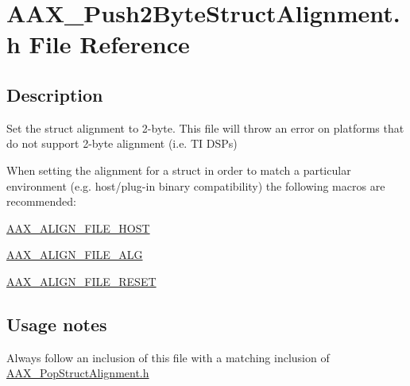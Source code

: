 \hypertarget{a00284}{}\section{A\+A\+X\+\_\+\+Push2\+Byte\+Struct\+Alignment.\+h File Reference}
\label{a00284}


\subsection{Description}
Set the struct alignment to 2-\/byte. This file will throw an error on platforms that do not support 2-\/byte alignment (i.\+e. T\+I D\+S\+Ps) 

When setting the alignment for a struct in order to match a particular environment (e.\+g. host/plug-\/in binary compatibility) the following macros are recommended\+: \begin{DoxyItemize}
\item \hyperlink{a00149_acbef7ed7d077bc9812cb56417e1ad325}{A\+A\+X\+\_\+\+A\+L\+I\+G\+N\+\_\+\+F\+I\+L\+E\+\_\+\+H\+O\+S\+T} \item \hyperlink{a00149_a8fbeac3c5db5ac694e85a021ed74dc9e}{A\+A\+X\+\_\+\+A\+L\+I\+G\+N\+\_\+\+F\+I\+L\+E\+\_\+\+A\+L\+G} \item \hyperlink{a00149_a8aaaefcc3d87025e84d5ccb99b650a87}{A\+A\+X\+\_\+\+A\+L\+I\+G\+N\+\_\+\+F\+I\+L\+E\+\_\+\+R\+E\+S\+E\+T}\end{DoxyItemize}
\hypertarget{a00284_AAX_Push2ByteStructAlignment_usagenotes}{}\subsection{Usage notes}\label{a00284_AAX_Push2ByteStructAlignment_usagenotes}
\begin{DoxyItemize}
\item Always follow an inclusion of this file with a matching inclusion of \hyperlink{a00281}{A\+A\+X\+\_\+\+Pop\+Struct\+Alignment.\+h}\end{DoxyItemize}
